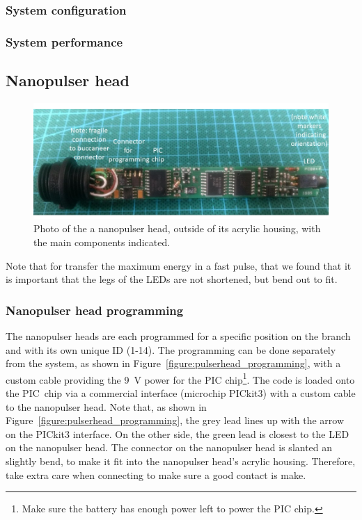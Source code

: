 \subsubsection*{System configuration}

%
%

\subsubsection*{System performance}


\subsection*{Nanopulser head}

\begin{figure}
\begin{center}	
  \includegraphics[width=1.0\linewidth]{figures/pulserhead.jpg}
  \caption{Photo of the a nanopulser head, outside of its acrylic housing, with the main components indicated.}
  \label{figure:pulserhead}
\end{center}
\end{figure}

Note that for transfer the maximum energy in a fast pulse, that we found that it is important that the legs of the LEDs are not shortened, but bend out to fit.

%
%

\subsubsection*{Nanopulser head programming}

The nanopulser heads are each programmed for a specific position on the branch and with its own unique ID (1-14). 
The programming can be done separately from the system, as shown in Figure~\ref{figure:pulserhead_programming}, with a custom cable providing the 9~V power for the PIC chip\footnote{Make sure the battery has enough power left to power the PIC chip.}. The code is loaded onto the PIC~chip via a commercial interface (microchip PICkit3) with a custom cable to the nanopulser head. Note that, as shown in Figure~\ref{figure:pulserhead_programming}, the grey lead lines up with the arrow on the PICkit3 interface. On the other side, the green lead is closest to the LED on the nanopulser head. The connector on the nanopulser head is slanted an slightly bend, to make it fit into the nanopulser head's acrylic housing. Therefore, take extra care when connecting to make sure a good contact is make.

